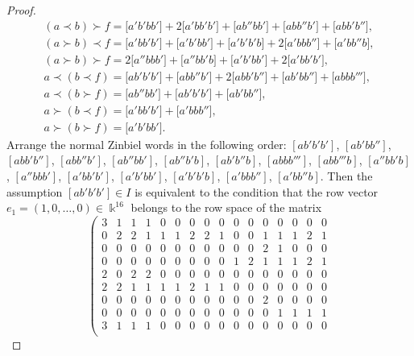 \begin{proof}
\begin{gather*}
%
(a\prec b)\succ f
 = \bigl[a'b'bb'\bigr]+2\bigl[a'bb'b'\bigr] + \bigl[ab''bb'\bigr]+\bigl[abb''b'\bigr]+\bigl[abb'b''\bigr], \\
%
(a\succ b)\prec f
 = \bigl[a'bb'b'\bigr]+\bigl[a'b'bb'\bigr]+\bigl[a'b'b'b\bigr] + 2\bigl[a'bbb''\bigr]+\bigl[a'bb''b\bigr], \\
%
(a\succ b)\succ f
 = 2\bigl[a''bbb'\bigr]+\bigl[a''bb'b\bigr]+\bigl[a'b'bb'\bigr]+2\bigl[a'bb'b'\bigr], \\
%
a\prec (b\prec f)
 = \bigl[ab'b'b'\bigr]+\bigl[abb''b'\bigr] +2\bigl[abb'b''\bigr] +\bigl[ab'bb''\bigr] + \bigl[abbb'''\bigr], \\
%
a\prec (b\succ f)
 = \bigl[ab''bb'\bigr]+\bigl[ab'b'b'\bigr]+\bigl[ab'bb''\bigr], \\
%
a\succ (b\prec f)
 = \bigl[a'bb'b'\bigr] + \bigl[a'bbb''\bigr], \\
%
a\succ (b\succ f)
 = \bigl[a'b'bb'\bigr].
\end{gather*}
Arrange the normal Zinbiel words in the following order:
$[ab'b'b']$, $[ab'bb'']$, $[abb'b'']$, $[abb''b']$, $[ab''bb']$, $[ab''b'b]$, $[ab'b''b]$, $[abbb''']$, $[abb'''b]$, $[a''bb'b]$, $[a''bbb']$, $[a'bb'b']$, $[a'b'bb']$, $[a'b'b'b]$, $[a'bbb'']$, $[a'bb''b]$.
Then the assumption $[ab'b'b']\in I$ is equivalent to the condition
that the row vector $e_1 = (1,0,\dots ,0)\in \Bbbk ^{16}$
belongs to the row space of the matrix
%
\[ \left(
\begin{array}{cccccccccccccccc}
3& 1& 1& 1& 0& 0& 0& 0& 0& 0& 0& 0& 0& 0& 0& 0\\
0& 2& 2& 1& 1& 1& 2& 2& 1& 0& 0& 1& 1& 1& 2& 1\\
0& 0& 0& 0& 0& 0& 0& 0& 0& 0& 0& 2& 1& 0& 0& 0\\
0& 0& 0& 0& 0& 0& 0& 0& 0& 1& 2& 1& 1& 1& 2& 1\\
2& 0& 2& 2& 0& 0& 0& 0& 0& 0& 0& 0& 0& 0& 0& 0\\
2& 2& 1& 1& 1& 1& 2& 1& 1& 0& 0& 0& 0& 0& 0& 0\\
0& 0& 0& 0& 0& 0& 0& 0& 0& 0& 0& 2& 0& 0& 0& 0\\
0& 0& 0& 0& 0& 0& 0& 0& 0& 0& 0& 0& 1& 1& 1& 1\\
3& 1& 1& 1& 0& 0& 0& 0& 0& 0& 0& 0& 0& 0& 0& 0\\

\end{array}\]
\end{proof}

